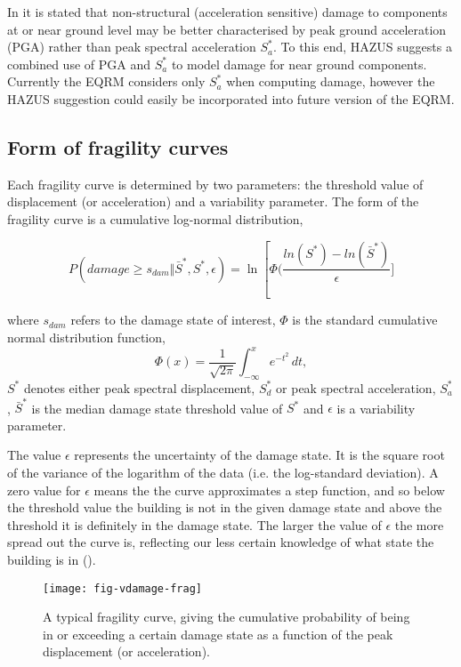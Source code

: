 In \citet[pages 5-19]{dr_FEMA99b} it is stated that non-structural
(acceleration sensitive) damage to components at or near ground
level may be better characterised by peak ground acceleration
(PGA) rather than peak spectral acceleration $S^*_a$. To this end,
HAZUS suggests a combined use of PGA and $S^*_a$ to model damage
for near ground components. Currently the EQRM considers only
$S^*_a$ when computing damage, however the HAZUS suggestion could
easily be incorporated into future version of the EQRM.


\subsection{Form of fragility curves}

Each fragility curve is determined by two
parameters: the threshold value of displacement (or acceleration)
and a variability parameter. The form of the fragility
curve is a cumulative log-normal
distribution,

\begin{equation}
\label{eq:vdamage-frag} P(damage \ge s_{dam} \Vert \bar S^*,S^*,\epsilon) =
\ln\left[\Phi(\frac{ln(S^*) - ln(\bar S^*)}{\epsilon}]
\end{equation}


where $s_{dam}$ refers to the damage state of interest, $\Phi$ is
the standard cumulative normal distribution function,
$$
 \Phi(x) = \frac{1}{\sqrt{2\pi}}\int_{-\infty}^x e^{-t^2}\,dt,
$$
$S^*$ denotes either peak spectral displacement, $S_d^*$ or peak spectral acceleration,
$S_a^*$, $\bar S^*$ is the median damage state threshold value of
$S^*$ and $\epsilon$ is a variability parameter.

The value $\epsilon$ represents the uncertainty of the damage
state. It is the square root of the variance of the logarithm of
the data (i.e. the log-standard deviation). A zero value for
$\epsilon$ means the the curve approximates a step function, and
so below the threshold value the building is not in the given
damage state and above the threshold it is definitely in the
damage state. The larger the value of $\epsilon$ the more spread
out the curve is, reflecting our less certain knowledge of what
state the building is in ().


\begin{figure}[htp]
\label{fig:dam-fragility-var-dstate} \centering
{}
 
\texttt{[image: fig-vdamage-frag]}
\caption{A typical fragility curve, giving
the cumulative probability of
  being in or exceeding
  a certain damage state as a function of the
 peak displacement (or acceleration).}
\label{fig:vdamage-frag}
\end{figure}

